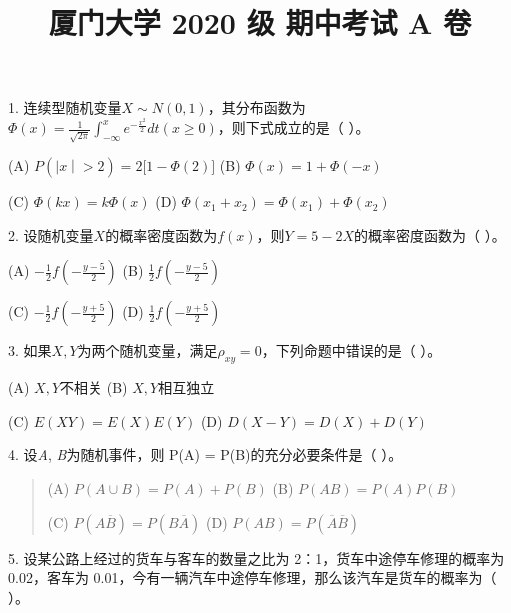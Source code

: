 \documentclass[fontset=exam]{exam-zh}
\title{厦门大学 2020 级 期中考试 A 卷}
\begin{document}
\maketitle
{}

\par{}\smallskip

1. 连续型随机变量\(\left. X \right.\sim N(0,1)\)，其分布函数为\(\Phi(x) = \frac{1}{\sqrt{2\pi}}{\int_{- \infty}^{x}e^{- \frac{x^{2}}{2}}}dt\left( {x \geq 0} \right)\)，则下式成立的是（ ）。

(A) \(P\left( \left| x \middle| > 2 \right. \right) = 2\lbrack 1 - \Phi(2)\rbrack\) (B) \(\Phi(x) = 1 + \Phi( - x)\)

(C) \(\Phi(kx) = k\Phi(x)\) (D) \(\Phi(x_{1} + x_{2}) = \Phi(x_{1}) + \Phi(x_{2})\)

2. 设随机变量\(X\)的概率密度函数为\(f(x)\)，则\(Y = 5 - 2X\)的概率密度函数为（ ）。

(A) \(- \frac{1}{2}f( - \frac{y - 5}{2})\) (B) \(\frac{1}{2}f( - \frac{y - 5}{2})\)

(C) \(- \frac{1}{2}f( - \frac{y + 5}{2})\) (D) \(\frac{1}{2}f( - \frac{y + 5}{2})\)

3. 如果\(X,Y\)为两个随机变量，满足\(\rho_{xy} = 0\)，下列命题中错误的是（ ）。

(A) \(X,Y\)不相关 (B) \(X,Y\text{相互独立}\)

(C) \(E\left( {XY} \right) = E(X)E(Y)\) (D) \(D\left( {X - Y} \right) = D(X) + D(Y)\)

4. 设\emph{A}, \emph{B}为随机事件，则 P(A) = P(B)的充分必要条件是（ ）。

\begin{quote}
(A) \(P(A \cup B) = P(A) + P(B)\) (B) \(P(AB) = P(A)P(B)\)

(C) \(P(A\overline{B}) = P(B\overline{A})\) (D) \(P(AB) = P(\overline{A}\overline{B})\)
\end{quote}

5. 设某公路上经过的货车与客车的数量之比为 2：1，货车中途停车修理的概率为 0.02，客车为 0.01，今有一辆汽车中途停车修理，那么该汽车是货车的概率为（ ）。
\end{document}
